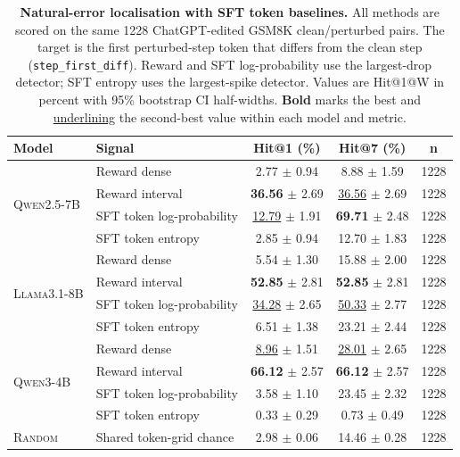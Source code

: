 \begin{table}[t]
\centering
\small
\setlength{\tabcolsep}{5pt}
\caption{\textbf{Natural-error localisation with SFT token baselines.} All methods are scored on the same 1228 ChatGPT-edited GSM8K clean/perturbed pairs. The target is the first perturbed-step token that differs from the clean step (\texttt{step\_first\_diff}). Reward and SFT log-probability use the largest-drop detector; SFT entropy uses the largest-spike detector. Values are Hit@1@W in percent with 95\% bootstrap CI half-widths. \textbf{Bold} marks the best and \underline{underlining} the second-best value within each model and metric.}
\label{tab:localisation_chatgpt_step_sft_hit1_hit7}
\begin{tabular}{llccc}
\toprule
\textbf{Model} & \textbf{Signal} & \textbf{Hit@1 (\%)} & \textbf{Hit@7 (\%)} & \textbf{n} \\
\midrule
\multirow{4}{*}{\textsc{Qwen2.5-7B}} & Reward dense & 2.77 $\pm$ 0.94 & 8.88 $\pm$ 1.59 & 1228 \\
 & Reward interval & \textbf{36.56} $\pm$ 2.69 & \underline{36.56} $\pm$ 2.69 & 1228 \\
 & SFT token log-probability & \underline{12.79} $\pm$ 1.91 & \textbf{69.71} $\pm$ 2.48 & 1228 \\
 & SFT token entropy & 2.85 $\pm$ 0.94 & 12.70 $\pm$ 1.83 & 1228 \\
\midrule
\multirow{4}{*}{\textsc{Llama3.1-8B}} & Reward dense & 5.54 $\pm$ 1.30 & 15.88 $\pm$ 2.00 & 1228 \\
 & Reward interval & \textbf{52.85} $\pm$ 2.81 & \textbf{52.85} $\pm$ 2.81 & 1228 \\
 & SFT token log-probability & \underline{34.28} $\pm$ 2.65 & \underline{50.33} $\pm$ 2.77 & 1228 \\
 & SFT token entropy & 6.51 $\pm$ 1.38 & 23.21 $\pm$ 2.44 & 1228 \\
\midrule
\multirow{4}{*}{\textsc{Qwen3-4B}} & Reward dense & \underline{8.96} $\pm$ 1.51 & \underline{28.01} $\pm$ 2.65 & 1228 \\
 & Reward interval & \textbf{66.12} $\pm$ 2.57 & \textbf{66.12} $\pm$ 2.57 & 1228 \\
 & SFT token log-probability & 3.58 $\pm$ 1.10 & 23.45 $\pm$ 2.32 & 1228 \\
 & SFT token entropy & 0.33 $\pm$ 0.29 & 0.73 $\pm$ 0.49 & 1228 \\
\midrule
\textsc{Random} & Shared token-grid chance & 2.98 $\pm$ 0.06 & 14.46 $\pm$ 0.28 & 1228 \\
\bottomrule
\end{tabular}
\end{table}
